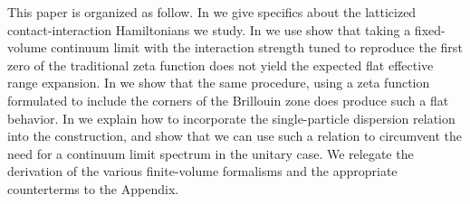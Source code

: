 This paper is organized as follow.  In  we give specifics about the latticized contact-interaction Hamiltonians we study.  In  we use show that taking a fixed-volume continuum limit with the interaction strength tuned to reproduce the first zero of the traditional zeta function does not yield the expected flat effective range expansion.  In  we show that the same procedure, using a zeta function formulated to include the corners of the Brillouin zone does produce such a flat behavior.
In  we explain how to incorporate the single-particle dispersion relation into the \Luscher construction, and show that we can use such a relation to circumvent the need for a continuum limit spectrum in the unitary case.
We relegate the derivation of the various finite-volume formalisms and the appropriate counterterms to the Appendix.
